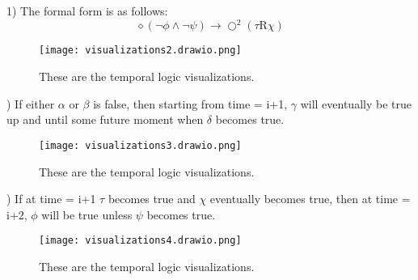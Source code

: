 \documentclass{article}
\begin{document}
\subsection{}
1)\newline\newline
The formal form is as follows: \[\diamond(\neg\phi\land\neg\psi)\rightarrow\bigcirc^2(\tau\text{R}\chi)\]
\begin{figure}[h]
    \centering
    \texttt{[image: visualizations2.drawio.png]}
    \caption{These are the temporal logic visualizations.}
    \label{fig:temporal2}
\end{figure})\newline\newline
If either $\alpha$ or $\beta$ is false, then starting from time = i+1, $\gamma$ will eventually be true up and until some future moment when $\delta$ becomes true.
\begin{figure}[h]
    \centering
    \texttt{[image: visualizations3.drawio.png]}
    \caption{These are the temporal logic visualizations.}
    \label{fig:temporal3}
\end{figure})\newline\newline
If at time = i+1 $\tau$ becomes true and $\chi$ eventually becomes true, then at time = i+2, $\phi$ will be true unless $\psi$ becomes true.
\begin{figure}[h]
    \centering
    \texttt{[image: visualizations4.drawio.png]}
    \caption{These are the temporal logic visualizations.}
    \label{fig:temporal4}
\end{figure}\newline
\end{document}
